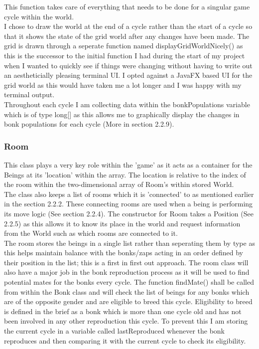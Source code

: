 \documentclass[12pt]{article}
\begin{document}
This function takes care of everything that needs to be done for a singular game cycle within the world. \\

I chose to draw the world at the end of a cycle rather than the start of a cycle so that it shows the state of the grid world after any changes have been made. The grid is drawn through a seperate function named displayGridWorldNicely() as this is the successor to the initial function I had during the start of my project when I wanted to quickly see if things were changing without having to write out an aestheticially pleasing terminal UI. I opted against a JavaFX based UI for the grid world as this would have taken me a lot longer and I was happy with my terminal output.\\

Throughout each cycle I am collecting data within the bonkPopulations variable which is of type long[] as this allows me to graphically display the changes in bonk populations for each cycle (More in section 2.2.9).

\subsubsection{Room}
This class plays a very key role within the 'game' as it acts as a container for the Beings at its 'location' within the array. The location is relative to the index of the room within the two-dimensional array of Room's within stored World.\\

The class also keeps a list of rooms which it is 'connected' to as mentioned earlier in the section 2.2.2. These connecting rooms are used when a being is performing its move logic (See section 2.2.4). The constructor for Room takes a Position (See 2.2.5) as this allows it to know its place in the world and request information from the World such as which rooms are connected to it.\\

The room stores the beings in a single list rather than seperating them by type as this helps maintain balance with the bonks/zaps acting in an order defined by their position in the list; this is a first in first out approach. The room class will also have a major job in the bonk reproduction process as it will be used to find potential mates for the bonks every cycle. The function findMate() shall be called from within the Bonk class and will check the list of beings for any bonks which are of the opposite gender and are eligible to breed this cycle. Eligibility to breed is defined in the brief as a bonk which is more than one cycle old and has not been involved in any other reproduction this cycle. To prevent this I am storing the current cycle in a variable called lastReproduced whenever the bonk reproduces and then comparing it with the current cycle to check its eligibility.  
\end{document}
